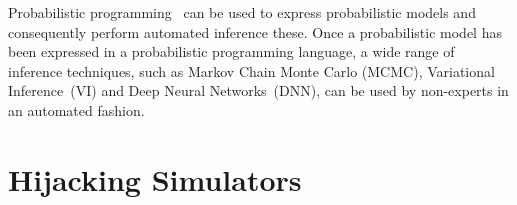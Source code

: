 \documentclass{article}
\begin{document}
Probabilistic programming~\cite{gordon2014probabilistic,staton2016semantics,kozen1979semantics} 
can be used to express probabilistic models and consequently perform automated inference these. Once a probabilistic model has been expressed in a probabilistic programming language, a wide range of inference techniques, such as Markov Chain Monte Carlo (MCMC)\cite{geyer1992practical}, Variational Inference~(VI)\cite{wainwright2008graphical} and Deep Neural Networks~(DNN)\cite{Goodfellow:2016:DL:3086952},  can be used by non-experts in an automated fashion. 
 







\section{Hijacking Simulators}
\label{sec:methods}
\end{document}
